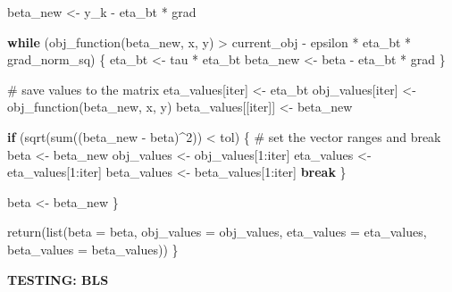 \documentclass[
  letterpaper,
  DIV=11,
  numbers=noendperiod]{scrartcl}
\newenvironment{Shaded}{\begin{snugshade}}{\end{snugshade}}
\newcommand{\AttributeTok}[1]{\textcolor[rgb]{0.40,0.45,0.13}{#1}}
\newcommand{\CommentTok}[1]{\textcolor[rgb]{0.37,0.37,0.37}{#1}}
\newcommand{\ControlFlowTok}[1]{\textcolor[rgb]{0.00,0.23,0.31}{\textbf{#1}}}
\newcommand{\DecValTok}[1]{\textcolor[rgb]{0.68,0.00,0.00}{#1}}
\newcommand{\FunctionTok}[1]{\textcolor[rgb]{0.28,0.35,0.67}{#1}}
\newcommand{\NormalTok}[1]{\textcolor[rgb]{0.00,0.23,0.31}{#1}}
\newcommand{\OtherTok}[1]{\textcolor[rgb]{0.00,0.23,0.31}{#1}}
\newcommand{\SpecialCharTok}[1]{\textcolor[rgb]{0.37,0.37,0.37}{#1}}
\begin{document}
\begin{Shaded}
\begin{Highlighting}[]
\NormalTok{    beta\_new }\OtherTok{\textless{}{-}}\NormalTok{ y\_k }\SpecialCharTok{{-}}\NormalTok{ eta\_bt }\SpecialCharTok{*}\NormalTok{ grad}
    
    \ControlFlowTok{while}\NormalTok{ (}\FunctionTok{obj\_function}\NormalTok{(beta\_new, x, y) }\SpecialCharTok{\textgreater{}}\NormalTok{ current\_obj }\SpecialCharTok{{-}}\NormalTok{ epsilon }\SpecialCharTok{*}\NormalTok{ eta\_bt }\SpecialCharTok{*}\NormalTok{ grad\_norm\_sq) \{}
\NormalTok{      eta\_bt }\OtherTok{\textless{}{-}}\NormalTok{ tau }\SpecialCharTok{*}\NormalTok{ eta\_bt}
\NormalTok{      beta\_new }\OtherTok{\textless{}{-}}\NormalTok{ beta }\SpecialCharTok{{-}}\NormalTok{ eta\_bt }\SpecialCharTok{*}\NormalTok{ grad}
\NormalTok{    \}}
    
    \CommentTok{\# save values to the matrix}
\NormalTok{    eta\_values[iter] }\OtherTok{\textless{}{-}}\NormalTok{ eta\_bt}
\NormalTok{    obj\_values[iter] }\OtherTok{\textless{}{-}} \FunctionTok{obj\_function}\NormalTok{(beta\_new, x, y)}
\NormalTok{    beta\_values[[iter]] }\OtherTok{\textless{}{-}}\NormalTok{ beta\_new}
    
    \ControlFlowTok{if}\NormalTok{ (}\FunctionTok{sqrt}\NormalTok{(}\FunctionTok{sum}\NormalTok{((beta\_new }\SpecialCharTok{{-}}\NormalTok{ beta)}\SpecialCharTok{\^{}}\DecValTok{2}\NormalTok{)) }\SpecialCharTok{\textless{}}\NormalTok{ tol) \{}
      \CommentTok{\# set the vector ranges and break}
\NormalTok{      beta }\OtherTok{\textless{}{-}}\NormalTok{ beta\_new}
\NormalTok{      obj\_values }\OtherTok{\textless{}{-}}\NormalTok{ obj\_values[}\DecValTok{1}\SpecialCharTok{:}\NormalTok{iter]}
\NormalTok{      eta\_values }\OtherTok{\textless{}{-}}\NormalTok{ eta\_values[}\DecValTok{1}\SpecialCharTok{:}\NormalTok{iter]}
\NormalTok{      beta\_values }\OtherTok{\textless{}{-}}\NormalTok{ beta\_values[}\DecValTok{1}\SpecialCharTok{:}\NormalTok{iter]}
      \ControlFlowTok{break}
\NormalTok{    \}}
    
\NormalTok{    beta }\OtherTok{\textless{}{-}}\NormalTok{ beta\_new}
\NormalTok{  \}}
  
  \FunctionTok{return}\NormalTok{(}\FunctionTok{list}\NormalTok{(}\AttributeTok{beta =}\NormalTok{ beta, }\AttributeTok{obj\_values =}\NormalTok{ obj\_values, }\AttributeTok{eta\_values =}\NormalTok{ eta\_values, }\AttributeTok{beta\_values =}\NormalTok{ beta\_values))}
\NormalTok{\}}
\end{Highlighting}
\end{Shaded}

\textbf{TESTING: BLS}
\end{document}
